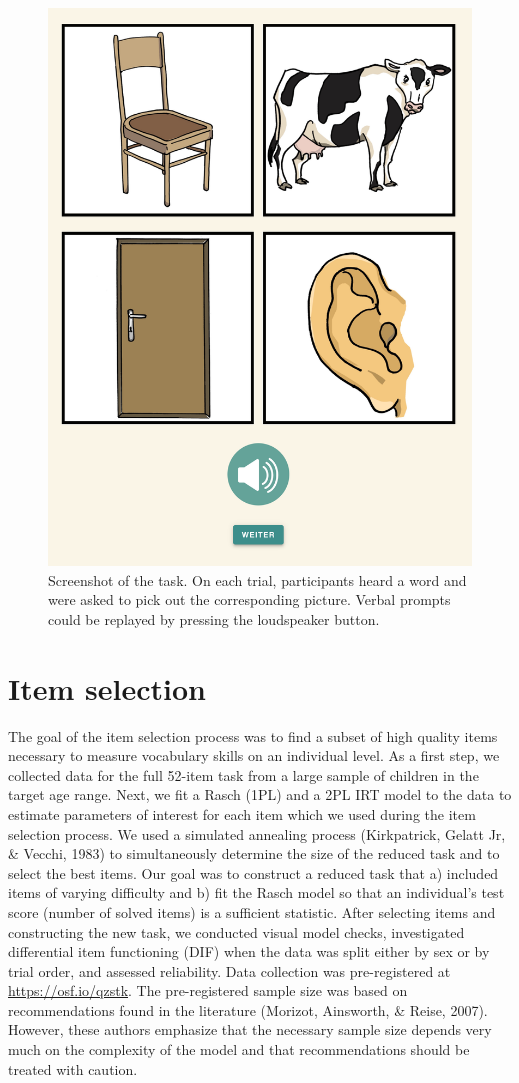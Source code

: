 \documentclass[
  man,floatsintext]{apa6}
\begin{document}
\begin{figure}

{\centering \includegraphics[width=0.5\linewidth]{../graphs/task_fig} 

}

\caption{Screenshot of the task. On each trial, participants heard a word and were asked to pick out the corresponding picture. Verbal prompts could be replayed by pressing the loudspeaker button.}\label{fig:fig1}
\end{figure}

\hypertarget{item-selection}{%
\section{Item selection}\label{item-selection}}

The goal of the item selection process was to find a subset of high quality items necessary to measure vocabulary skills on an individual level. As a first step, we collected data for the full 52-item task from a large sample of children in the target age range. Next, we fit a Rasch (1PL) and a 2PL IRT model to the data to estimate parameters of interest for each item which we used during the item selection process. We used a simulated annealing process (Kirkpatrick, Gelatt Jr, \& Vecchi, 1983) to simultaneously determine the size of the reduced task and to select the best items. Our goal was to construct a reduced task that a) included items of varying difficulty and b) fit the Rasch model so that an individual's test score (number of solved items) is a sufficient statistic. After selecting items and constructing the new task, we conducted visual model checks, investigated differential item functioning (DIF) when the data was split either by sex or by trial order, and assessed reliability. Data collection was pre-registered at \url{https://osf.io/qzstk}. The pre-registered sample size was based on recommendations found in the literature (Morizot, Ainsworth, \& Reise, 2007). However, these authors emphasize that the necessary sample size depends very much on the complexity of the model and that recommendations should be treated with caution.
\end{document}
